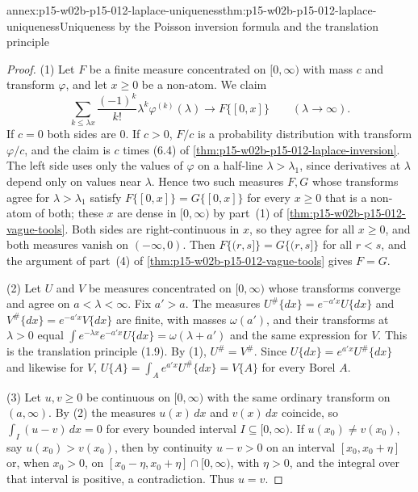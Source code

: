 \begin{annexitem}{annex:p15-w02b-p15-012-laplace-uniqueness}{thm:p15-w02b-p15-012-laplace-uniqueness}{Uniqueness by the Poisson inversion formula and the translation principle}
\begin{proof}
(1) Let \(F\) be a finite measure concentrated on \([0,\infty)\) with mass
\(c\) and transform \(\varphi\), and let \(x\geq0\) be a non-atom. We claim
\[
 \sum_{k\leq\lambda x}\frac{(-1)^k}{k!}\lambda^k\varphi^{(k)}(\lambda)\longrightarrow F\{[0,x]\}
 \qquad(\lambda\to\infty).
\]
If \(c=0\) both sides are \(0\). If \(c>0\), \(F/c\) is a probability
distribution with transform \(\varphi/c\), and the claim is \(c\) times (6.4)
of \cref{thm:p15-w02b-p15-012-laplace-inversion}. The left side uses only the
values of \(\varphi\) on a half-line \(\lambda>\lambda_1\), since derivatives
at \(\lambda\) depend only on values near \(\lambda\). Hence two such measures
\(F,G\) whose transforms agree for \(\lambda>\lambda_1\) satisfy
\(F\{[0,x]\}=G\{[0,x]\}\) for every \(x\geq0\) that is a non-atom of both;
these \(x\) are dense in \([0,\infty)\) by part~(1) of
\cref{thm:p15-w02b-p15-012-vague-tools}. Both sides are right-continuous in
\(x\), so they agree for all \(x\geq0\), and both measures vanish on
\((-\infty,0)\). Then \(F\{(r,s]\}=G\{(r,s]\}\) for all \(r<s\), and the
argument of part~(4) of \cref{thm:p15-w02b-p15-012-vague-tools} gives \(F=G\).

(2) Let \(U\) and \(V\) be measures concentrated on \([0,\infty)\) whose
transforms converge and agree on \(a<\lambda<\infty\). Fix \(a'>a\). The
measures \(U^\#\{dx\}=e^{-a'x}U\{dx\}\) and \(V^\#\{dx\}=e^{-a'x}V\{dx\}\) are
finite, with masses \(\omega(a')\), and their transforms at \(\lambda>0\)
equal \(\int e^{-\lambda x}e^{-a'x}U\{dx\}=\omega(\lambda+a')\) and the same
expression for \(V\). This is the translation principle (1.9). By (1),
\(U^\#=V^\#\). Since \(U\{dx\}=e^{a'x}U^\#\{dx\}\) and likewise for \(V\),
\(U\{A\}=\int_Ae^{a'x}U^\#\{dx\}=V\{A\}\) for every Borel \(A\).

(3) Let \(u,v\geq0\) be continuous on \([0,\infty)\) with the same ordinary
transform on \((a,\infty)\). By (2) the measures \(u(x)\,dx\) and
\(v(x)\,dx\) coincide, so \(\int_I(u-v)\,dx=0\) for every bounded interval
\(I\subseteq[0,\infty)\). If \(u(x_0)\neq v(x_0)\), say \(u(x_0)>v(x_0)\), then
by continuity \(u-v>0\) on an interval \([x_0,x_0+\eta]\) or, when \(x_0>0\),
on \([x_0-\eta,x_0+\eta]\cap[0,\infty)\), with \(\eta>0\), and the integral
over that interval is positive, a contradiction. Thus \(u=v\).
\end{proof}
\end{annexitem}

